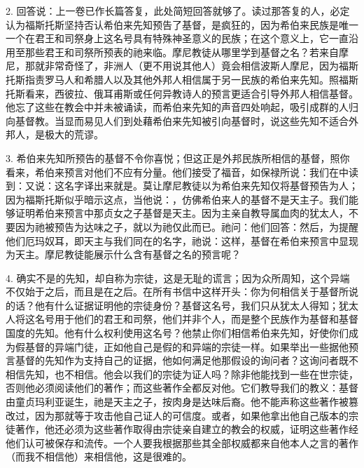 2. 回答说：上一卷已作长篇答复，此处简短回答就够了。读过那答复的人，必定认为福斯托斯坚持否认希伯来先知预告了基督，是疯狂的，因为希伯来民族是唯一一个在君王和司祭身上这名号具有特殊神圣意义的民族；在这个意义上，它一直沿用至那些君王和司祭所预表的祂来临。摩尼教徒从哪里学到基督之名？若来自摩尼，那就非常奇怪了，非洲人（更不用说其他人）竟会相信波斯人摩尼，因为福斯托斯指责罗马人和希腊人以及其他外邦人相信属于另一民族的希伯来先知。照福斯托斯看来，西彼拉、俄耳甫斯或任何异教诗人的预言更适合引导外邦人相信基督。他忘了这些在教会中并未被诵读，而希伯来先知的声音四处响起，吸引成群的人归向基督教。当显而易见人们到处藉希伯来先知被引向基督时，说这些先知不适合外邦人，是极大的荒谬。\par

3. 希伯来先知所预告的基督不令你喜悦；但这正是外邦民族所相信的基督，照你看来，希伯来预言对他们不应有分量。他们接受了福音，如保禄所说：我们在中读到：又说：这名字译出来就是。莫让摩尼教徒以为希伯来先知仅将基督预告为人；因为福斯托斯似乎暗示这点，当他说：，仿佛希伯来人的基督不是天主子。我们能够证明希伯来预言中那贞女之子基督是天主。因为主亲自教导属血肉的犹太人，不要因为祂被预告为达味之子，就以为祂仅此而已。祂问：他们回答：然后，为提醒他们厄玛奴耳，即天主与我们同在的名字，祂说：这样，基督在希伯来预言中显现为天主。摩尼教徒能展示什么含有基督之名的预言呢？\par

4. 确实不是的先知，却自称为宗徒，这是无耻的谎言；因为众所周知，这个异端不仅始于之后，而且是在之后。在所有书信中这样开头：你为何相信关于基督所说的话？他有什么证据证明他的宗徒身份？基督这名号，我们只从犹太人得知；犹太人将这名号用于他们的君王和司祭，他们并非个人，而是整个民族作为基督和基督国度的先知。他有什么权利使用这名号？他禁止你们相信希伯来先知，好使你们成为假基督的异端门徒，正如他自己是假的和异端的宗徒一样。如果举出一些据他预言基督的先知作为支持自己的证据，他如何满足他那假设的询问者？这询问者既不相信先知，也不相信。他会以我们的宗徒为证人吗？除非他能找到一些在世宗徒，否则他必须阅读他们的著作；而这些著作全都反对他。它们教导我们的教义：基督由童贞玛利亚诞生，祂是天主之子，按肉身是达味后裔。他不能声称这些著作被篡改过，因为那就等于攻击他自己证人的可信度。或者，如果他拿出他自己版本的宗徒著作，他还必须为这些著作取得由宗徒亲自建立的教会的权威，证明这些著作经他们认可被保存和流传。一个人要我根据那些其全部权威都来自他本人之言的著作（而我不相信他）来相信他，这是很难的。\par


